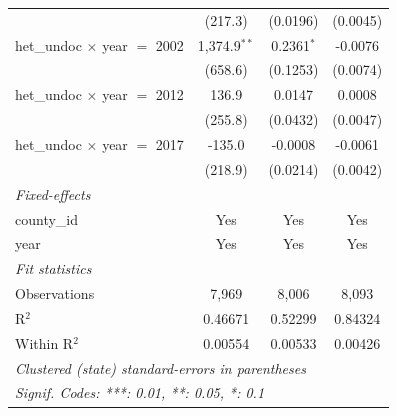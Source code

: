 \begin{tabular}{lccc}
                                                   & (217.3)                          & (0.0196)                     & (0.0045)\\   
   het\_undoc $\times$ year $=$ 2002               & 1,374.9$^{**}$                   & 0.2361$^{*}$                 & -0.0076\\   
                                                   & (658.6)                          & (0.1253)                     & (0.0074)\\   
   het\_undoc $\times$ year $=$ 2012               & 136.9                            & 0.0147                       & 0.0008\\   
                                                   & (255.8)                          & (0.0432)                     & (0.0047)\\   
   het\_undoc $\times$ year $=$ 2017               & -135.0                           & -0.0008                      & -0.0061\\   
                                                   & (218.9)                          & (0.0214)                     & (0.0042)\\   
   \midrule
   \emph{Fixed-effects}\\
   county\_id                                      & Yes                              & Yes                          & Yes\\  
   year                                            & Yes                              & Yes                          & Yes\\  
   \midrule
   \emph{Fit statistics}\\
   Observations                                    & 7,969                            & 8,006                        & 8,093\\  
   R$^2$                                           & 0.46671                          & 0.52299                      & 0.84324\\  
   Within R$^2$                                    & 0.00554                          & 0.00533                      & 0.00426\\  
   \midrule \midrule
   \multicolumn{4}{l}{\emph{Clustered (state) standard-errors in parentheses}}\\
   \multicolumn{4}{l}{\emph{Signif. Codes: ***: 0.01, **: 0.05, *: 0.1}}\\
\end{tabular}
\par\endgroup


